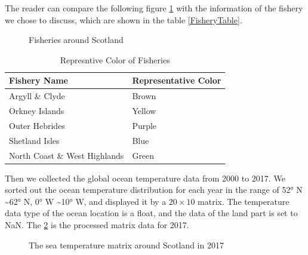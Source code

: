 \documentclass{mcmthesis}
\numberwithin{figure}{section}
\numberwithin{table}{section}
\begin{document}
The reader can compare the following figure \ref{FisheriesAround} with the information of the fishery we chose to discuss, which are shown in the table \ref{FisheryTable}.
\begin{figure}[H]
  \caption{Fisheries around Scotland}\label{FisheriesAround}
\end{figure}

\begin{table}[H]
\centering
\begin{tabular}{|l|l|}%
\hline  %
\textbf{Fishery Name}&\textbf{Representative Color}\\
\hline  %
Argyll \& Clyde & Brown\\
\hline %
Orkney Islands & Yellow\\
\hline %
Outer Hebrides  & Purple\\
\hline %
Shetland Isles & Blue\\
\hline %
North Coast \& West Highlands & Green\\
\hline %
\end{tabular}
\caption{Represntive Color of Fisheries}
\label{FisheryColor}
\end{table}

Then we collected the global ocean temperature data from 2000 to 2017. We sorted out the ocean temperature distribution for each year in the range of \ang{52} N \textasciitilde \ang{62} N, \ang{0} W \textasciitilde \ang{10} W, and displayed it by a $20 \times 10$ matrix. The temperature data type of the ocean location is a float, and the data of the land part is set to NaN. The \ref{FP} is the processed matrix data for 2017.

\begin{figure}[H]
  \caption{The sea temperature matrix around Scotland in 2017}\label{FP}
\end{figure}
\end{document}
